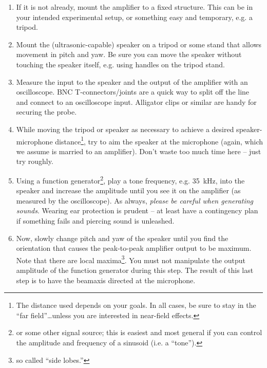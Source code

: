 \documentclass[letterpaper]{article}
\begin{document}
\begin{enumerate}
\item If it is not already, mount the amplifier to a fixed
  structure. This can be in your intended experimental setup, or
  something easy and temporary, e.g. a tripod.

\item Mount the (ultrasonic-capable) speaker on a tripod or some stand
  that allows movement in pitch and yaw. Be sure you can move the
  speaker without touching the speaker itself, e.g. using handles on
  the tripod stand.

\item Measure the input to the speaker and the output of the amplifier
  with an oscilloscope. BNC T-connectors/joints are a quick way to split off
  the line and connect to an oscilloscope input. Alligator clips or
  similar are handy for securing the probe.

\item While moving the tripod or speaker as necessary to achieve a
  desired speaker-microphone distance\footnote{The distance used
    depends on your goals. In all cases, be sure to stay in the ``far
    field''\ldots unless you are interested in near-field effects.},
  try to aim the speaker at the microphone (again, which we assume is
  married to an amplifier). Don't waste too much time here -- just try
  roughly.

\item Using a function generator\footnote{or some other signal source;
  this is easiest and most general if you can control the amplitude
  and frequency of a sinusoid (i.e. a ``tone'').}, play a tone
  frequency, e.g. 35~kHz, into the speaker and increase the amplitude
  until you see it on the amplifier (as measured by the
  oscilloscope). As always, \textit{please be careful when generating
    sounds}. Wearing ear protection is prudent -- at least have a
  contingency plan if something fails and piercing sound is unleashed.

\item Now, slowly change pitch and yaw of the speaker until you find
  the orientation that causes the peak-to-peak amplifier output to be
  maximum. Note that there are local maxima\footnote{so called ``side
    lobes.''}. You must not manipulate the output amplitude of the
  function generator during this step. The result of this last step is
  to have the beamaxis directed at the microphone.
\end{enumerate}
\end{document}
